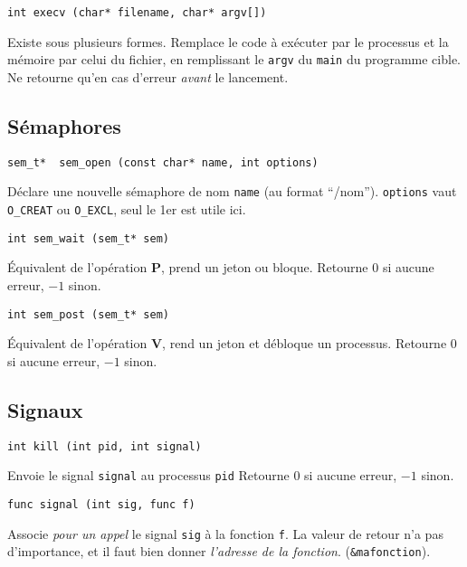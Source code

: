\documentclass[a4paper]{article}
\begin{document}
\begin{multicols*}{2}
    \begin{lstlisting}
int execv (char* filename, char* argv[])
    \end{lstlisting}

    Existe sous plusieurs formes.
    Remplace le code à exécuter par le processus et la mémoire par celui du fichier, en remplissant le \texttt{argv} du \texttt{main} du programme cible.
    Ne retourne qu'en cas d'erreur \emph{avant} le lancement.

    \subsection{Sémaphores}

    \begin{lstlisting}
sem_t*  sem_open (const char* name, int options)
    \end{lstlisting}
    Déclare une nouvelle sémaphore de nom \texttt{name} (au format ``/nom''). 
    \texttt{options} vaut \texttt{O\_CREAT} ou \texttt{O\_EXCL}, seul le 1er est utile ici.


    \begin{lstlisting}
int sem_wait (sem_t* sem)
    \end{lstlisting}
    \'Equivalent de l'opération \textbf{P}, prend un jeton ou bloque.
    Retourne $0$ si aucune erreur, $-1$ sinon.


    \begin{lstlisting}
int sem_post (sem_t* sem)
    \end{lstlisting}
    \'Equivalent de l'opération \textbf{V}, rend un jeton et débloque un processus.
    Retourne $0$ si aucune erreur, $-1$ sinon.

    \subsection{Signaux}

    \begin{lstlisting}
int kill (int pid, int signal)
    \end{lstlisting}
    Envoie le signal \texttt{signal} au processus \texttt{pid}
    Retourne $0$ si aucune erreur, $-1$ sinon.

    \begin{lstlisting}
func signal (int sig, func f)
    \end{lstlisting}
    Associe \emph{pour un appel} le signal \texttt{sig} à la fonction \texttt{f}.
    La valeur de retour n'a pas d'importance, et il faut bien donner \emph{l'adresse de la fonction}.
    (\texttt{\&mafonction}).


\end{multicols*}
\end{document}
